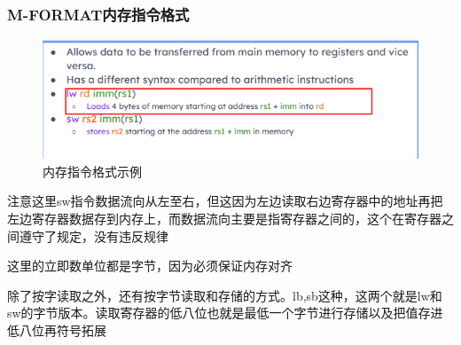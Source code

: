 \documentclass{ctexart}
\begin{document}
\subsubsection{M-FORMAT内存指令格式}\par
\begin{figure}
    \centering
    \includegraphics[width=0.25\linewidth]{内存指令格式示例.png}
    \caption{内存指令格式示例}
    \label{fig:enter-label}
\end{figure}
注意这里sw指令数据流向从左至右，但这因为左边读取右边寄存器中的地址再把左边寄存器数据存到内存上，而数据流向主要是指寄存器之间的，这个在寄存器之间遵守了规定，没有违反规律\par
这里的立即数单位都是字节，因为必须保证内存对齐\par
除了按字读取之外，还有按字节读取和存储的方式。lb,sb这种，这两个就是lw和sw的字节版本。读取寄存器的低八位也就是最低一个字节进行存储以及把值存进低八位再符号拓展\par
\end{document}

